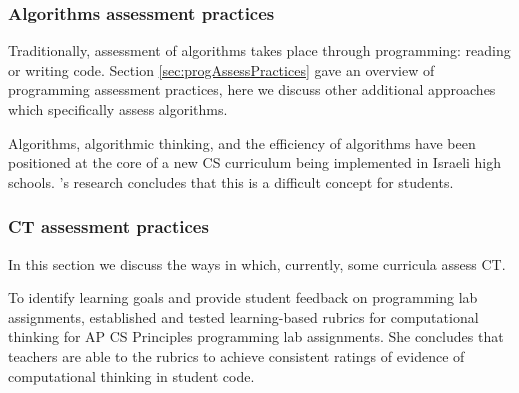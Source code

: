 

\subsubsection{Algorithms assessment practices}
Traditionally, assessment of algorithms takes place through programming: reading or writing code. Section \ref{sec:progAssessPractices} gave an overview of programming assessment practices, here we discuss other additional approaches which specifically assess algorithms.



Algorithms, algorithmic thinking, and the efficiency of algorithms have been positioned at the core of a new CS curriculum being implemented in Israeli high schools\cite{gal2002efficiency}. \cite{gal2002efficiency}'s research concludes that this is a difficult concept for students.


\subsubsection{CT assessment practices}

In this section we discuss the ways in which, currently, some curricula assess CT.

To identify learning goals and provide student feedback on programming lab assignments,  established and tested learning-based rubrics for computational thinking for AP CS Principles programming lab assignments. She concludes that teachers are able to the rubrics to achieve consistent ratings of evidence of computational thinking in student code.

